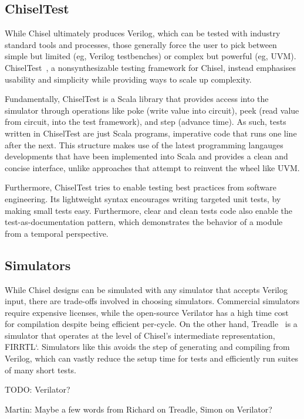 \documentclass[conference]{IEEEtran}
\newcommand{\todo}[1]{{\color{olive} TODO: #1}}
\newcommand{\martin}[1]{{\color{blue} Martin: #1}}
\begin{document}
\subsection{ChiselTest}

While Chisel ultimately produces Verilog, which can be tested with industry standard tools and processes, those generally force the user to pick between simple but limited (eg, Verilog testbenches) or complex but powerful (eg, UVM).
ChiselTest~\cite{chisel:tester2}, a nonsynthesizable testing framework for Chisel, instead emphasises usability and simplicity while providing ways to scale up complexity.

Fundamentally, ChiselTest is a Scala library that provides access into the simulator through operations like poke (write value into circuit), peek (read value from circuit, into the test framework), and step (advance time).
As such, tests written in ChiselTest are just Scala programs, imperative code that runs one line after the next.
This structure makes use of the latest programming langauges developments that have been implemented into Scala and provides a clean and concise interface, unlike approaches that attempt to reinvent the wheel like UVM.

Furthermore, ChiselTest tries to enable testing best practices from software engineering.
Its lightweight syntax encourages writing targeted unit tests, by making small tests easy.
Furthermore, clear and clean tests code also enable the test-as-documentation pattern, which demonstrates the behavior of a module from a temporal perspective.


\subsection{Simulators}

While Chisel designs can be simulated with any simulator that accepts Verilog input, there are trade-offs involved in choosing simulators.
Commercial simulators require expensive licenses, while the open-source Verilator has a high time cost for compilation despite being efficient per-cycle.
On the other hand, Treadle~\cite{treadle} is a simulator that operates at the level of Chisel's intermediate representation, FIRRTL`\cite{firrtl}.
Simulators like this avoids the step of generating and compiling from Verilog, which can vastly reduce the setup time for tests and efficiently run suites of many short tests.

\todo{Verilator?}

\martin{Maybe a few words from Richard on Treadle, Simon on Verilator?}
\end{document}
